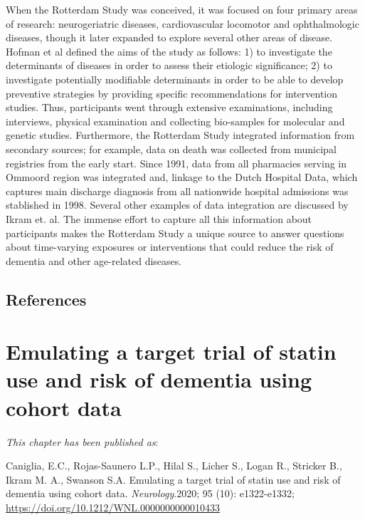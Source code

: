 \documentclass[
]{book}
\begin{document}
When the Rotterdam Study was conceived, it was focused on four primary areas of research: neurogeriatric diseases, cardiovascular locomotor and ophthalmologic diseases, though it later expanded to explore several other areas of disease. Hofman et al defined the aims of the study as follows: 1) to investigate the determinants of diseases in order to assess their etiologic significance; 2) to investigate potentially modifiable determinants in order to be able to develop preventive strategies by providing specific recommendations for intervention studies\autocite{hofman1991}. Thus, participants went through extensive examinations, including interviews, physical examination and collecting bio-samples for molecular and genetic studies. Furthermore, the Rotterdam Study integrated information from secondary sources; for example, data on death was collected from municipal registries from the early start. Since 1991, data from all pharmacies serving in Ommoord region was integrated and, linkage to the Dutch Hospital Data, which captures main discharge diagnosis from all nationwide hospital admissions was stablished in 1998. Several other examples of data integration are discussed by Ikram et. al\autocite{ikram2020}. The immense effort to capture all this information about participants makes the Rotterdam Study a unique source to answer questions about time-varying exposures or interventions that could reduce the risk of dementia and other age-related diseases.

\newpage

\hypertarget{references}{%
\section{References}\label{references}}

\hypertarget{chapter2}{%
\chapter{Emulating a target trial of statin use and risk of dementia using cohort data}\label{chapter2}}


\small

\noindent
\emph{This chapter has been published as}:

Caniglia, E.C., Rojas-Saunero L.P., Hilal S., Licher S., Logan R., Stricker B., Ikram M. A., Swanson S.A. Emulating a target trial of statin use and risk of dementia using cohort data. \emph{Neurology}.2020; 95 (10): e1322-e1332;
\url{https://doi.org/10.1212/WNL.0000000000010433}
\end{document}
